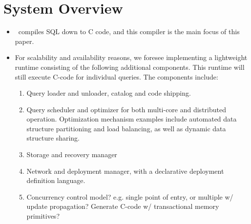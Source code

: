 \section{System Overview}

\begin{itemize}
  \item \compiler\ compiles SQL down to C code, and this compiler is the main
  focus of this paper.
  \item For scalability and availability reasons, we foresee implementing a
  lightweight runtime consisting of the following additional components. This
  runtime will still execute C-code for individual queries. The components
  include:
  \begin{enumerate}
    \item Query loader and unloader, catalog and code shipping.
    \item Query scheduler and optimizer for both multi-core and distributed
    operation. Optimization mechanism examples include automated data structure
    partitioning and load balancing, as well as dynamic data structure sharing.
    \item Storage and recovery manager
    \item Network and deployment manager, with a declarative deployment
    definition language.
    \item Concurrency control model? e.g. single point of entry, or
    multiple w/ update propagation? Generate C-code w/ transactional memory
    primitives?
  \end{enumerate}
\end{itemize}